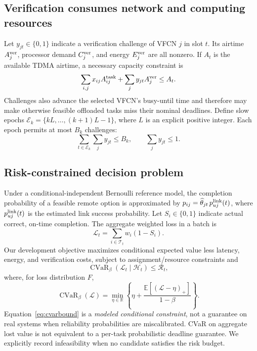 \documentclass[journal]{IEEEtran}
\newcommand{\EE}{\mathbb E}
\newcommand{\TT}{\mathcal T}
\newcommand{\HH}{\mathcal H}
\newcommand{\Loss}{\mathcal L}
\newcommand{\RISK}{\mathcal R}
\newcommand{\CVaR}{\operatorname{CVaR}}
\begin{document}
\subsection{Verification consumes network and computing resources}
Let $y_{jt}\in\{0,1\}$ indicate a verification challenge of VFCN $j$ in slot $t$. Its airtime $A_j^{\rm ver}$, processor demand $C_j^{\rm ver}$, and energy $E_j^{\rm ver}$ are all nonzero. If $A_t$ is the available TDMA airtime, a necessary capacity constraint is
\begin{equation}\label{eq:air}
 \sum_{i,j}x_{ij}A_{ij}^{\rm task}+\sum_j y_{jt}A_j^{\rm ver}\le A_t.
\end{equation}
Challenges also advance the selected VFCN's busy-until time and therefore may make otherwise feasible offloaded tasks miss their nominal deadlines. Define slow epochs $\mathcal E_k=\{kL,\ldots,(k+1)L-1\}$, where $L$ is an explicit positive integer. Each epoch permits at most $B_k$ challenges:
\begin{equation}\label{eq:epoch}
 \sum_{t\in\mathcal E_k}\sum_j y_{jt}\le B_k,\qquad
 \sum_j y_{jt}\le1.
\end{equation}

\subsection{Risk-constrained decision problem}
Under a conditional-independent Bernoulli reference model, the completion probability of a feasible remote option is approximated by $p_{ij}=\widehat\theta_{jt}\,p_{uj}^{\rm link}(t)$, where $p_{uj}^{\rm link}(t)$ is the estimated link success probability. Let $S_i\in\{0,1\}$ indicate actual correct, on-time completion. The aggregate weighted loss in a batch is
\begin{equation}\label{eq:loss}
 \Loss_t=\sum_{i\in\TT_t}w_i(1-S_i).
\end{equation}
Our development objective maximizes conditional expected value less latency, energy, and verification costs, subject to assignment/resource constraints and
\begin{equation}\label{eq:cvarbound}
 \CVaR_{\beta}(\Loss_t\mid\HH_t)\le \RISK_t,
\end{equation}
where, for loss distribution $F$,
\begin{equation}\label{eq:cvar}
 \CVaR_\beta(\Loss)=\min_{\eta\in\mathbb R}
 \left\{\eta+\frac{\EE[(\Loss-\eta)_+]}{1-\beta}\right\}.
\end{equation}
Equation~\eqref{eq:cvarbound} is a \emph{modeled conditional constraint}, not a guarantee on real systems when reliability probabilities are miscalibrated. CVaR on aggregate lost value is not equivalent to a per-task probabilistic deadline guarantee. We explicitly record infeasibility when no candidate satisfies the risk budget.
\end{document}

